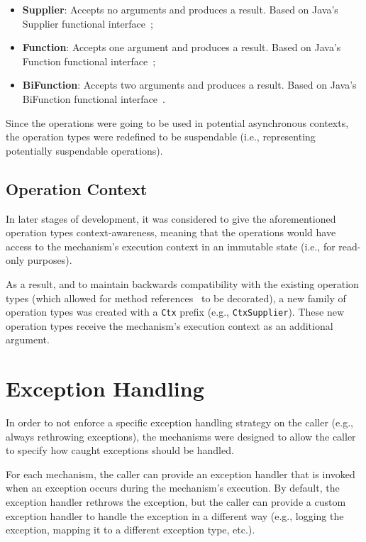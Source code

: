 \begin{itemize}
    \item \textbf{Supplier}: Accepts no arguments and produces a result.
    Based on Java's Supplier functional interface~\cite{java-supplier};
    \item \textbf{Function}: Accepts one argument and produces a result.
    Based on Java's Function functional interface~\cite{java-function};
    \item \textbf{BiFunction}: Accepts two arguments and produces a result.
    Based on Java's BiFunction functional interface~\cite{java-bifunction}.
\end{itemize}

Since the operations were going to be used in potential asynchronous contexts,
the operation types were redefined to be suspendable (i.e., representing potentially suspendable operations).

\subsection{Operation Context}\label{subsec:operation-context}

In later stages of development, it was considered to give the aforementioned operation types context-awareness,
meaning that the operations would have access to the mechanism's execution context in an immutable state
(i.e., for read-only purposes).

As a result, and to maintain backwards compatibility with the existing operation types (which allowed for method references~\cite{java-method-references} to be decorated), a new family of operation types was created with a \texttt{Ctx} prefix (e.g., \texttt{CtxSupplier}).
These new operation types receive the mechanism's execution context as an additional argument.


\section{Exception Handling}\label{sec:exception-handling}

In order to not enforce a specific exception handling strategy on the caller (e.g., always rethrowing exceptions),
the mechanisms were designed to allow the caller to specify how caught exceptions should be handled.

For each mechanism,
the caller can provide an exception handler that is invoked when an exception occurs during the mechanism's execution.
By default, the exception handler rethrows the exception,
but the caller can provide a custom exception handler to handle the exception in a different way
(e.g., logging the exception, mapping it to a different exception type, etc.).


